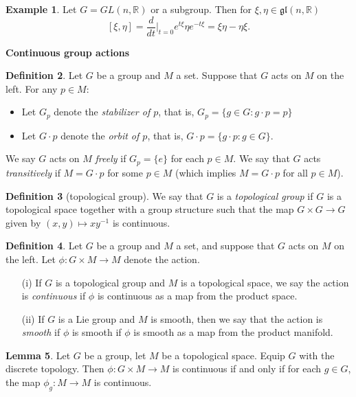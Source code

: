 \documentclass{amsart}
\numberwithin{equation}{section}
\newcommand{\bR}{\mathbb{R}}
\newcommand{\fgl}{\mathfrak{gl}}
\theoremstyle{definition}
\newtheorem{definition}{Definition} [section]
\newtheorem{example}[definition]{Example}
\theoremstyle{theorem}
\newtheorem{lemma}[definition]{Lemma}
\begin{document}
\begin{example}
Let $G = GL(n,\mathbb{R})$ or a subgroup. Then for $\xi,\eta\in \fgl(n,\bR)$ 
\[
[\xi, \eta] = \frac{d}{dt}\Big|_{t=0}e^{t\xi}\eta e^{-t\xi} = \xi \eta - \eta \xi.
\]
\end{example}

\bigskip

\noindent
{\bf \large Continuous group actions}

\begin{definition}
Let $G$ be a group and $M$ a set. Suppose that $G$ acts on $M$ on the left. For any $p \in M$:
\begin{itemize} 
\item Let $G_p$ denote the {\em stabilizer of $p$}, that is, 
$G_p = \{g \in G : g \cdot p = p\}$
\item  Let $G \cdot p$ denote the {\em orbit of $p$}, that is, 
$G \cdot p = \{g \cdot p : g \in G\}$.
\end{itemize}
We say $G$ acts on $M$ {\em freely} if $G_p = \{e\}$ for each $p \in M$. 
We say that $G$ acts {\em transitively} if $M = G\cdot p$ for some $p \in M$ (which implies
$M=G\cdot p$ for all $p\in M$). 
\end{definition}

\begin{definition}[topological group]
We say that $G$ is a {\em topological group} if $G$ is a topological space together with a group structure such that the map $G \times G \to G$ given by $(x,y) \mapsto xy^{-1}$ is continuous. 
\end{definition}

\begin{definition}
Let $G$ be a group and $M$ a set, and suppose that $G$ acts on $M$ on the left. Let $\phi : G \times M \to M$ denote the action. 
\begin{enumerate}
\item[(i)] If $G$ is a topological group and $M$ is a topological space, we say the action is {\em continuous} if $\phi$ is continuous as a map from the product space. 
\item[(ii)] If $G$ is a Lie group and $M$ is smooth, then we say that the action is {\em smooth} if $\phi$ is {smooth} if $\phi$ is smooth as a map from the product manifold. 
\end{enumerate}
\end{definition}

\begin{lemma}
Let $G$ be a group, let $M$ be a topological space. Equip $G$ with the discrete topology. Then $\phi : G \times M \to M$ is continuous if and only if for each $g \in G$, the map $\phi_g : M \to M$ is continuous. 
\end{lemma}
\end{document}
